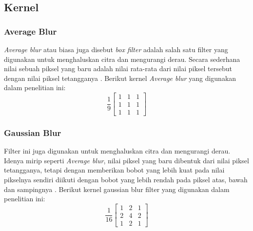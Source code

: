 \subsection{Kernel}

\subsubsection{Average Blur}
\textit{Average blur} atau biasa juga disebut \textit{box filter} adalah salah satu filter yang digunakan untuk menghaluskan citra dan mengurangi derau. Secara sederhana nilai sebuah piksel yang baru adalah nilai rata-rata dari nilai piksel tersebut dengan nilai piksel tetangganya \cite{pdf:marcin}. Berikut kernel \textit{Average blur} yang digunakan dalam penelitian ini:
\begin{equation}
    \label{kernel:average}
    \frac{1}{9} \left[
    \begin{matrix}
 1 & 1 & 1 \\
 1 & 1 & 1 \\
 1 & 1 & 1
    \end{matrix}
    \right]
\end{equation}

\subsubsection{Gaussian Blur}
Filter ini juga digunakan untuk menghaluskan citra dan mengurangi derau. Idenya mirip seperti \textit{Average blur}, nilai piksel yang baru dibentuk dari nilai piksel tetangganya, tetapi dengan memberikan bobot yang lebih kuat pada nilai pikselnya sendiri diikuti dengan bobot yang lebih rendah pada piksel atas, bawah dan sampingnya \cite{soa:dmitry}. Berikut kernel gaussian blur filter yang digunakan dalam penelitian ini:
\begin{equation}
    \label{kernel:gaussianblur}
    \frac{1}{16}
    \left[
    \begin{matrix}
 1 & 2 & 1 \\
 2 & 4 & 2 \\
 1 & 2 & 1
    \end{matrix}
    \right]
\end{equation}

